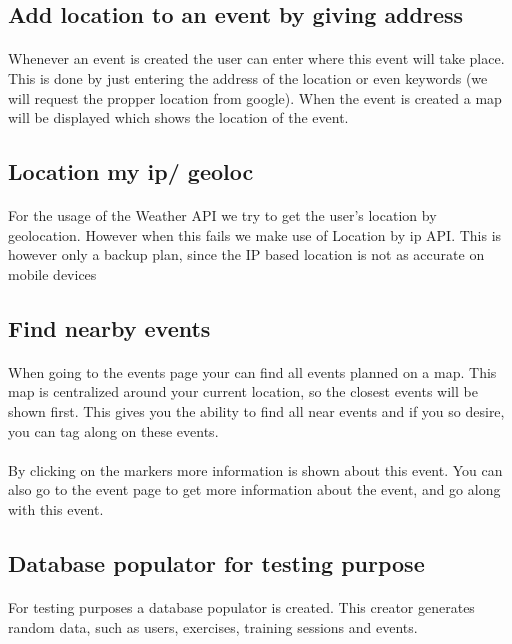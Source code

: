 \documentclass[11pt,a4paper]{scrartcl}
\begin{document}
\subsection{Add location to an event by giving address}
\paragraph{}Whenever an event is created the user can enter where this event will take place. This is done by just entering the address of the location or even keywords (we will request the propper location from google). When the event is created a map will be displayed which shows the location of the event.
\subsection{Location my ip/ geoloc}
\paragraph{}For the usage of the Weather API we try to get the user's location by geolocation. However when this fails we make use of Location by ip API. This is however only a backup plan, since the IP based location is not as accurate on mobile devices
\subsection{Find nearby events}
\paragraph{}When going to the events page your can find all events planned on a map. This map is centralized around your current location, so the closest events will be shown first. This gives you the ability to find all near events and if you so desire, you can tag along on these events.
\paragraph{}By clicking on the markers more information is shown about this event. You can also go to the event page to get more information about the event, and go along with this event.
\subsection{Database populator for testing purpose}
\paragraph{}For testing purposes a database populator is created. This creator generates random data, such as users, exercises, training sessions and events.
\end{document}
